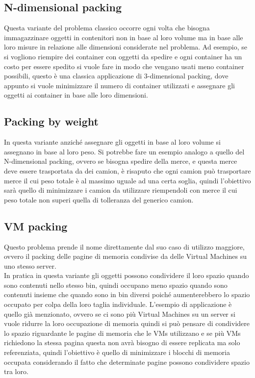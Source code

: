 \subsection{N-dimensional packing}
Questa variante del problema classico occorre ogni volta che bisogna immagazzinare oggetti in contenitori non in base al
loro volume ma in base alle loro misure in relazione alle dimensioni considerate nel problema. Ad esempio, se si vogliono
riempire dei container con oggetti da spedire e ogni container ha un costo per essere spedito si vuole fare in modo
che vengano usati meno container possibili, questo è una classica applicazione di 3-dimensional packing, dove appunto si vuole
minimizzare il numero di container utilizzati e assegnare gli oggetti ai container in base alle loro dimensioni.

\subsection{Packing by weight}
In questa variante anziché assegnare gli oggetti in base al loro volume si assegnano in base al loro peso. Si potrebbe fare un
esempio analogo a quello del N-dimensional packing, ovvero se bisogna spedire della merce, e questa merce deve essere trasportata
da dei camion, è risaputo che ogni camion può trasportare merce il cui peso totale è al massimo uguale ad una certa soglia, quindi 
l'obiettivo sarà quello di minimizzare i camion da utilizzare riempendoli con merce il cui peso totale non superi quella di tolleranza
del generico camion.

\subsection{VM packing}
Questo problema prende il nome direttamente dal suo caso di utilizzo maggiore, ovvero il packing delle pagine di memoria
condivise da delle Virtual Machines su uno stesso server.\\
In pratica in questa variante gli oggetti possono condividere il loro spazio quando sono contenuti nello stesso bin, quindi occupano
meno spazio quando sono contenuti insieme che quando sono in bin diversi poiché aumenterebbero lo spazio occupato 
per colpa della loro taglia individuale. L'esempio di applicazione è quello già menzionato, ovvero se ci sono più Virtual Machines
su un server si vuole ridurre la loro occupazione di memoria quindi si può pensare di condividere lo spazio riguardante le pagine di memoria
che le VMs utilizzano e se più VMs richiedono la stessa pagina questa non avrà bisogno di essere replicata ma solo referenziata,
quindi l'obiettivo è quello di minimizzare i blocchi di memoria occupata considerando il fatto che determinate pagine possono
condividere spazio tra loro.

